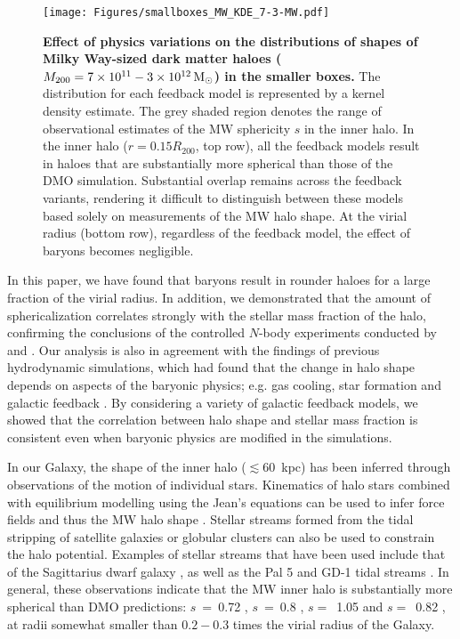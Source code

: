 \documentclass[fleqn,usenatbib]{mnras}
\def\msun{\,\rm M_{\odot}}
\begin{document}
\begin{figure*}
    \centering
    \texttt{[image: Figures/smallboxes\_MW\_KDE\_7-3-MW.pdf]}
    \caption{{\bf Effect of physics variations on the distributions of shapes of Milky Way-sized dark matter haloes  ($M_{200}=7\times10^{11}-3\times10^{12} \msun$) in the smaller boxes.}
    The distribution for each feedback model is represented by a kernel density estimate. 
    The grey shaded region denotes the range of observational estimates of the MW sphericity $s$ in the inner halo.
    In the inner halo ($r=0.15R_{200}$, top row), all the feedback models result in haloes that are substantially more spherical than those of the DMO simulation. 
    Substantial overlap remains across the feedback variants, rendering it difficult to distinguish between these models based solely on measurements of the MW halo shape.
    At the virial radius (bottom row), regardless of the feedback model, the effect of baryons becomes negligible. 
    }
    \label{fig:smallboxes_MW}
\end{figure*}


In this paper, we have found that baryons result in rounder haloes for a large fraction of the virial radius.
In addition, we demonstrated that the amount of sphericalization correlates strongly with the stellar mass fraction of the halo, confirming the conclusions  of the controlled $N$-body experiments conducted by \cite{Debattista08v681} and \cite{Kazantzidis10v720}.
Our analysis is also in agreement with the findings of previous hydrodynamic simulations, which had found that the change in halo shape depends on aspects of the baryonic physics; e.g. gas cooling, star formation and galactic feedback \citep[e.g.][]{Bryan13v429,Butsky16v462,Prada19v490}.
By considering a variety of galactic feedback models, we showed that the correlation between halo shape and stellar mass fraction is consistent even when baryonic physics are modified in the simulations.

In our Galaxy, the shape of the inner halo (${\lesssim} 60$~kpc) has been inferred through observations of the motion of individual stars.
Kinematics of halo stars combined with equilibrium modelling using the Jean's equations can be used to infer force fields and thus the MW halo shape \cite[e.g.][]{Loebman2012,Bowden16v460}.
Stellar streams formed from the tidal stripping of satellite galaxies or globular clusters can also be used to constrain the halo potential.
Examples of stellar streams that have been used include that of the Sagittarius dwarf galaxy \citep{Ibata01v551,Law10v714,Vera-Ciro13v773}, as well as the Pal 5 and GD-1 tidal streams \citep{Bovy16v833}.
In general, these observations indicate that the MW inner halo is substantially more spherical than DMO predictions:
$s$~=~0.72 \citep[20-60 kpc][]{Law10v714}, $s$~=~0.8 \citep{Vera-Ciro13v773},  $s=$~1.05 \citep[20~kpc][]{Bovy16v833} and
$s=$~0.82 \citep{Malhan19v487}, at radii somewhat smaller than $0.2-0.3$ times the virial radius of the Galaxy.
\end{document}
